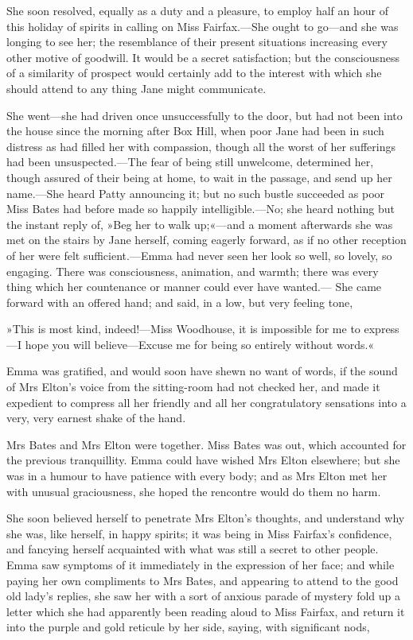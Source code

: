 She soon resolved, equally as a duty and a pleasure, to employ half an hour of this holiday of spirits in calling on Miss Fairfax.—She ought to go—and she was longing to see her; the resemblance of their present situations increasing every other motive of goodwill. It would be a secret satisfaction; but the consciousness of a similarity of prospect would certainly add to the interest with which she should attend to any thing Jane might communicate.

She went—she had driven once unsuccessfully to the door, but had not been into the house since the morning after Box Hill, when poor Jane had been in such distress as had filled her with compassion, though all the worst of her sufferings had been unsuspected.—The fear of being still unwelcome, determined her, though assured of their being at home, to wait in the passage, and send up her name.—She heard Patty announcing it; but no such bustle succeeded as poor Miss Bates had before made so happily intelligible.—No; she heard nothing but the instant reply of, »Beg her to walk up;«—and a moment afterwards she was met on the stairs by Jane herself, coming eagerly forward, as if no other reception of her were felt sufficient.—Emma had never seen her look so well, so lovely, so engaging. There was consciousness, animation, and warmth; there was every thing which her countenance or manner could ever have wanted.— She came forward with an offered hand; and said, in a low, but very feeling tone,

»This is most kind, indeed!—Miss Woodhouse, it is impossible for me to express—I hope you will believe—Excuse me for being so entirely without words.«

Emma was gratified, and would soon have shewn no want of words, if the sound of Mrs Elton's voice from the sitting-room had not checked her, and made it expedient to compress all her friendly and all her congratulatory sensations into a very, very earnest shake of the hand.

Mrs Bates and Mrs Elton were together. Miss Bates was out, which accounted for the previous tranquillity. Emma could have wished Mrs Elton elsewhere; but she was in a humour to have patience with every body; and as Mrs Elton met her with unusual graciousness, she hoped the rencontre would do them no harm.

She soon believed herself to penetrate Mrs Elton's thoughts, and understand why she was, like herself, in happy spirits; it was being in Miss Fairfax's confidence, and fancying herself acquainted with what was still a secret to other people. Emma saw symptoms of it immediately in the expression of her face; and while paying her own compliments to Mrs Bates, and appearing to attend to the good old lady's replies, she saw her with a sort of anxious parade of mystery fold up a letter which she had apparently been reading aloud to Miss Fairfax, and return it into the purple and gold reticule by her side, saying, with significant nods,

